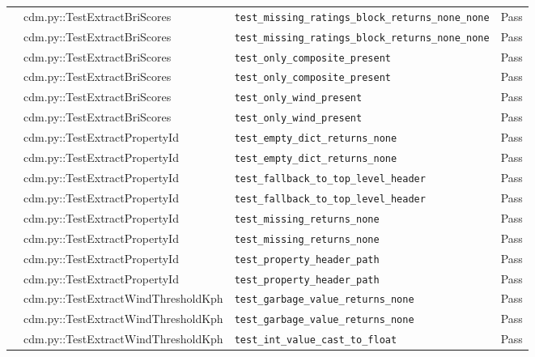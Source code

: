 \documentclass[11pt,a4paper]{article}
\begin{document}
\begin{center}
\begin{longtable}{p{2.2cm} p{4.5cm} p{6.5cm} p{1.4cm}}
     & cdm.py::TestExtractBriScores & \texttt{test\_missing\_ratings\_block\_returns\_none\_none} & \textcolor{green!60!black}{Pass} \\
     & cdm.py::TestExtractBriScores & \texttt{test\_missing\_ratings\_block\_returns\_none\_none} & \textcolor{green!60!black}{Pass} \\
     & cdm.py::TestExtractBriScores & \texttt{test\_only\_composite\_present} & \textcolor{green!60!black}{Pass} \\
     & cdm.py::TestExtractBriScores & \texttt{test\_only\_composite\_present} & \textcolor{green!60!black}{Pass} \\
     & cdm.py::TestExtractBriScores & \texttt{test\_only\_wind\_present} & \textcolor{green!60!black}{Pass} \\
     & cdm.py::TestExtractBriScores & \texttt{test\_only\_wind\_present} & \textcolor{green!60!black}{Pass} \\
     & cdm.py::TestExtractPropertyId & \texttt{test\_empty\_dict\_returns\_none} & \textcolor{green!60!black}{Pass} \\
     & cdm.py::TestExtractPropertyId & \texttt{test\_empty\_dict\_returns\_none} & \textcolor{green!60!black}{Pass} \\
     & cdm.py::TestExtractPropertyId & \texttt{test\_fallback\_to\_top\_level\_header} & \textcolor{green!60!black}{Pass} \\
     & cdm.py::TestExtractPropertyId & \texttt{test\_fallback\_to\_top\_level\_header} & \textcolor{green!60!black}{Pass} \\
     & cdm.py::TestExtractPropertyId & \texttt{test\_missing\_returns\_none} & \textcolor{green!60!black}{Pass} \\
     & cdm.py::TestExtractPropertyId & \texttt{test\_missing\_returns\_none} & \textcolor{green!60!black}{Pass} \\
     & cdm.py::TestExtractPropertyId & \texttt{test\_property\_header\_path} & \textcolor{green!60!black}{Pass} \\
     & cdm.py::TestExtractPropertyId & \texttt{test\_property\_header\_path} & \textcolor{green!60!black}{Pass} \\
     & cdm.py::TestExtractWindThresholdKph & \texttt{test\_garbage\_value\_returns\_none} & \textcolor{green!60!black}{Pass} \\
     & cdm.py::TestExtractWindThresholdKph & \texttt{test\_garbage\_value\_returns\_none} & \textcolor{green!60!black}{Pass} \\
     & cdm.py::TestExtractWindThresholdKph & \texttt{test\_int\_value\_cast\_to\_float} & \textcolor{green!60!black}{Pass} \\

\end{longtable}
\end{center}
\end{document}
